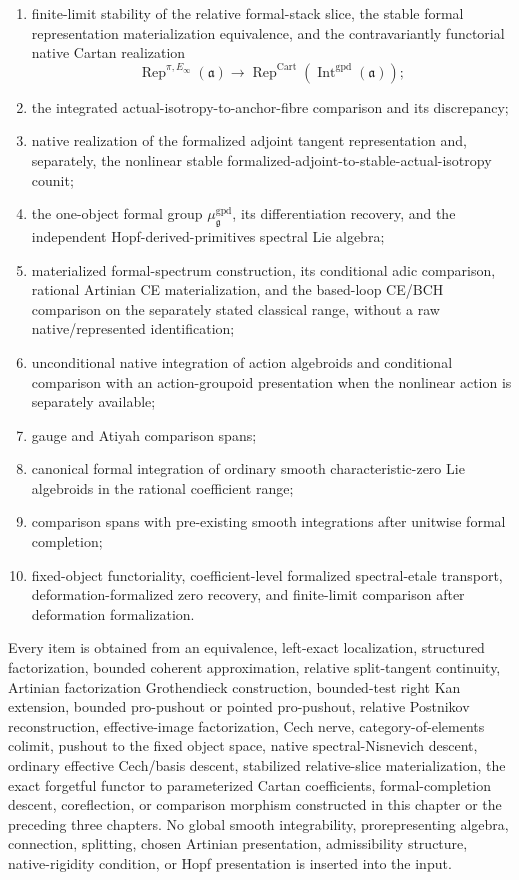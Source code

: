 \begin{theorem}
\begin{enumerate}
    \item finite-limit stability of the relative formal-stack slice, the
    stable formal representation materialization equivalence, and the
    contravariantly functorial native Cartan realization
    \[
        \operatorname{Rep}^{\pi,E_\infty}(\mathfrak a)
        \longrightarrow
        \operatorname{Rep}^{\mathrm{Cart}}
        (\operatorname{Int}^{\mathrm{gpd}}(\mathfrak a));
    \]
    \item the integrated actual-isotropy-to-anchor-fibre comparison and its
    discrepancy;
    \item native realization of the formalized adjoint tangent representation
    and, separately, the nonlinear stable formalized-adjoint-to-stable-actual-isotropy
    counit;
    \item the one-object formal group
    $\mu^{\mathrm{gpd}}_{\mathfrak g}$, its differentiation recovery, and the
    independent Hopf-derived-primitives spectral Lie algebra;
    \item materialized formal-spectrum construction, its conditional adic comparison,
    rational Artinian CE materialization, and the based-loop CE/BCH comparison
    on the separately stated classical range, without a raw native/represented
    identification;
    \item unconditional native integration of action algebroids and conditional
    comparison with an action-groupoid presentation when the nonlinear action
    is separately available;
    \item gauge and Atiyah comparison spans;
    \item canonical formal integration of ordinary smooth characteristic-zero
    Lie algebroids in the rational coefficient range;
    \item comparison spans with pre-existing smooth integrations after
    unitwise formal completion;
    \item fixed-object functoriality, coefficient-level formalized
    spectral-etale transport, deformation-formalized zero recovery, and
    finite-limit comparison after deformation formalization.
\end{enumerate}

Every item is obtained from an equivalence, left-exact localization,
structured factorization, bounded coherent approximation, relative
split-tangent continuity, Artinian factorization Grothendieck construction,
bounded-test right Kan extension, bounded pro-pushout or pointed pro-pushout,
relative Postnikov reconstruction, effective-image factorization, Cech nerve,
category-of-elements colimit, pushout to the fixed object space, native
spectral-Nisnevich descent, ordinary effective Cech/basis descent, stabilized
relative-slice materialization, the exact forgetful functor to parameterized
Cartan coefficients, formal-completion descent, coreflection, or
comparison morphism constructed in this chapter or the preceding three
chapters.  No global smooth integrability, prorepresenting
algebra, connection, splitting, chosen Artinian presentation, admissibility
structure, native-rigidity condition, or Hopf presentation is inserted into the
input.
\end{theorem}

